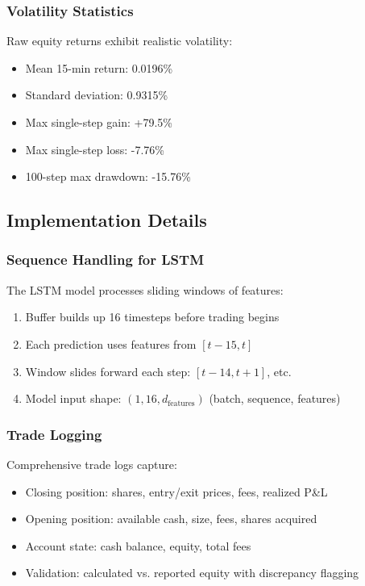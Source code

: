 \documentclass[12pt,a4paper]{article}
\begin{document}
\subsubsection{Volatility Statistics}
Raw equity returns exhibit realistic volatility:
\begin{itemize}
    \item Mean 15-min return: 0.0196\%
    \item Standard deviation: 0.9315\%
    \item Max single-step gain: +79.5\%
    \item Max single-step loss: -7.76\%
    \item 100-step max drawdown: -15.76\%
\end{itemize}

\subsection{Implementation Details}

\subsubsection{Sequence Handling for LSTM}
The LSTM model processes sliding windows of features:
\begin{enumerate}
    \item Buffer builds up 16 timesteps before trading begins
    \item Each prediction uses features from $[t-15, t]$
    \item Window slides forward each step: $[t-14, t+1]$, etc.
    \item Model input shape: $(1, 16, d_{\text{features}})$ (batch, sequence, features)
\end{enumerate}

\subsubsection{Trade Logging}
Comprehensive trade logs capture:
\begin{itemize}
    \item Closing position: shares, entry/exit prices, fees, realized P\&L
    \item Opening position: available cash, size, fees, shares acquired
    \item Account state: cash balance, equity, total fees
    \item Validation: calculated vs. reported equity with discrepancy flagging
\end{itemize}
\end{document}
